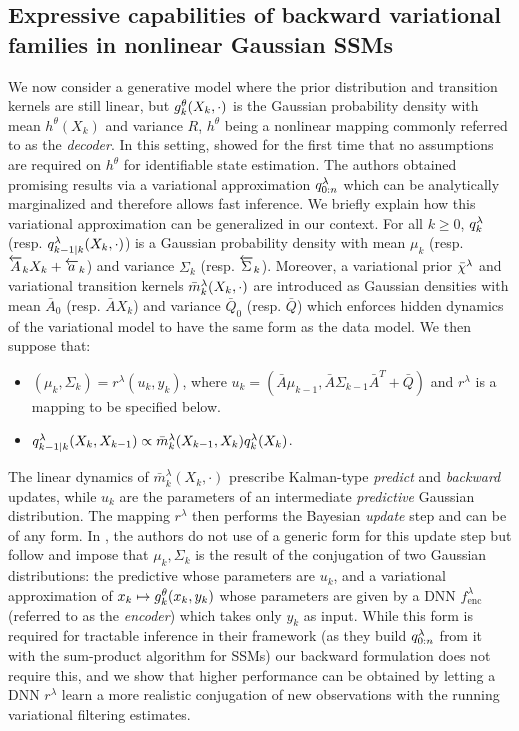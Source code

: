 \documentclass{article}
\begin{document}
\subsection{Expressive capabilities of backward variational families in nonlinear Gaussian SSMs}
\label{sec:experiments:nonlinear}

We now consider a generative model where the prior distribution and transition kernels are still linear, but $g_{k}^{\theta}(X_k,\cdot)$ is the Gaussian probability density with mean $h^\theta(X_k)$ and variance $R$, $h^\theta$ being a nonlinear mapping commonly referred to as the \textit{decoder}. In this setting, \cite{Hlv2021DisentanglingIF} showed for the first time that no assumptions are required on $h^\theta$ for identifiable state estimation. The authors obtained promising results via a variational approximation $q_{0:n}^{\lambda}$ which can be analytically marginalized and therefore allows fast inference. We briefly explain how this variational approximation can be generalized in our context. For all $k \geq 0$, $q_{k}^{\lambda}$ (resp. $q_{k-1|k}^{\lambda}(X_k,\cdot)$) is a Gaussian probability density with mean $\mu_k$ (resp. $\overleftarrow{A}_k X_k + \overleftarrow{a}_k$) and variance $\Sigma_k$ (resp.  $\overleftarrow{\Sigma}_k$).  Moreover, a variational prior $\bar{\chi}^\lambda$ and variational transition kernels $\bar{m}_k^\lambda(X_k, \cdot)$ are introduced as Gaussian densities with mean $\bar{A}_0$ (resp. $\bar{A} X_k$) and variance $\bar{Q}_0$ (resp. $\bar{Q}$) which enforces hidden dynamics of the variational model to have the same form as the data model. 
We then suppose that:
\begin{itemize}
    \item $\left(\mu_k, \Sigma_k\right) = r^\lambda(u_k, y_k)$, where $u_k = (\bar{A}\mu_{k-1}, \bar{A} \Sigma_{k-1} \bar{A}^T + \bar{Q})$ and $r^\lambda$ is a mapping to be specified below.
    \item $q_{k-1|k}^{\lambda}(X_k, X_{k-1}) \propto  \bar{m}_k^\lambda(X_{k-1}, X_k) q_{k}^{\lambda}(X_k)$.
\end{itemize}
The linear dynamics of $\bar{m}_k^\lambda(X_k, \cdot)$ prescribe Kalman-type \textit{predict} and \textit{backward} updates, while $u_k$ are the parameters of an intermediate \textit{predictive} Gaussian distribution. The mapping $r^\lambda$ then performs the Bayesian \textit{update} step and can be of any form. 
In \cite{Hlv2021DisentanglingIF}, the authors do not use of a generic form for this update step but follow \cite{johnson2016} and impose that $\mu_k,\Sigma_k$ is the result of the conjugation of two Gaussian distributions: the predictive whose parameters are $u_k$, and a variational approximation of $x_k \mapsto g_{k}^{\theta}(x_k, y_k)$ whose parameters are given by a DNN $f_{\mathrm{enc}}^\lambda$ (referred to as the \textit{encoder}) which takes only $y_k$ as input. While this form is required for tractable inference in their framework (as they build $q_{0:n}^{\lambda}$ from it with the sum-product algorithm for SSMs)  our backward formulation does not require this, and we show that higher performance can be obtained by letting a DNN $r^\lambda$ learn a more realistic conjugation of new observations with the running variational filtering estimates. 
\end{document}
